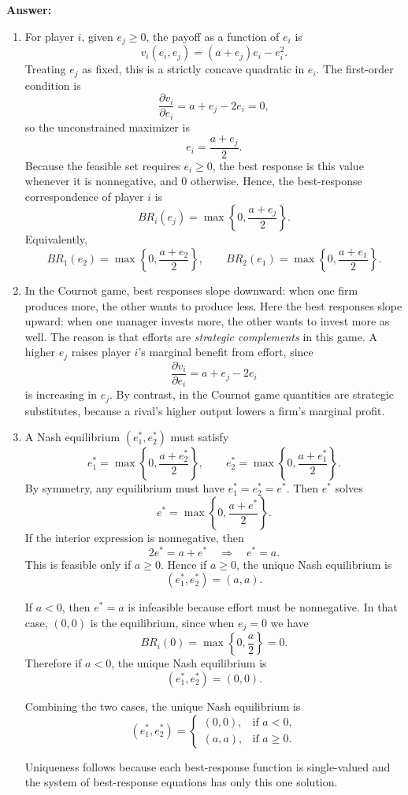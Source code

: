 \documentclass[12pt,a4paper]{article}
\begin{document}
\noindent\textbf{Answer:} 
\begin{enumerate}[label=(\alph*)]
  \item For player $i$, given $e_j\ge 0$, the payoff as a function of $e_i$ is
  \[
      v_i(e_i,e_j)=(a+e_j)e_i-e_i^2.
  \]
  Treating $e_j$ as fixed, this is a strictly concave quadratic in $e_i$. The first-order condition is
  \[
      \frac{\partial v_i}{\partial e_i}=a+e_j-2e_i=0,
  \]
  so the unconstrained maximizer is
  \[
      e_i=\frac{a+e_j}{2}.
  \]
  Because the feasible set requires $e_i\ge 0$, the best response is this value whenever it is nonnegative, and $0$ otherwise. Hence, the best-response correspondence of player $i$ is
  \[
      BR_i(e_j)=\max\!\left\{0,\frac{a+e_j}{2}\right\}.
  \]
  Equivalently,
  \[
      BR_1(e_2)=\max\!\left\{0,\frac{a+e_2}{2}\right\},
      \qquad
      BR_2(e_1)=\max\!\left\{0,\frac{a+e_1}{2}\right\}.
  \]

  \item In the Cournot game, best responses slope downward: when one firm produces more, the other wants to produce less. Here the best responses slope upward: when one manager invests more, the other wants to invest more as well. The reason is that efforts are \emph{strategic complements} in this game. A higher $e_j$ raises player $i$'s marginal benefit from effort, since
  \[
      \frac{\partial v_i}{\partial e_i}=a+e_j-2e_i
  \]
  is increasing in $e_j$. By contrast, in the Cournot game quantities are strategic substitutes, because a rival's higher output lowers a firm's marginal profit.

  \item A Nash equilibrium $(e_1^*,e_2^*)$ must satisfy
  \[
      e_1^*=\max\!\left\{0,\frac{a+e_2^*}{2}\right\},
      \qquad
      e_2^*=\max\!\left\{0,\frac{a+e_1^*}{2}\right\}.
  \]
  By symmetry, any equilibrium must have $e_1^*=e_2^*=e^*$. Then $e^*$ solves
  \[
      e^*=\max\!\left\{0,\frac{a+e^*}{2}\right\}.
  \]
  If the interior expression is nonnegative, then
  \[
      2e^*=a+e^* \quad \Rightarrow \quad e^*=a.
  \]
  This is feasible only if $a\ge 0$. Hence if $a\ge 0$, the unique Nash equilibrium is
  \[
      (e_1^*,e_2^*)=(a,a).
  \]

  If $a<0$, then $e^*=a$ is infeasible because effort must be nonnegative. In that case, $(0,0)$ is the equilibrium, since when $e_j=0$ we have
  \[
      BR_i(0)=\max\!\left\{0,\frac{a}{2}\right\}=0.
  \]
  Therefore if $a<0$, the unique Nash equilibrium is
  \[
      (e_1^*,e_2^*)=(0,0).
  \]

  Combining the two cases, the unique Nash equilibrium is
  \[
      (e_1^*,e_2^*)=
      \begin{cases}
          (0,0), & \text{if } a<0,\\
          (a,a), & \text{if } a\ge 0.
      \end{cases}
  \]

  Uniqueness follows because each best-response function is single-valued and the system of best-response equations has only this one solution.
\end{enumerate}
\end{document}
